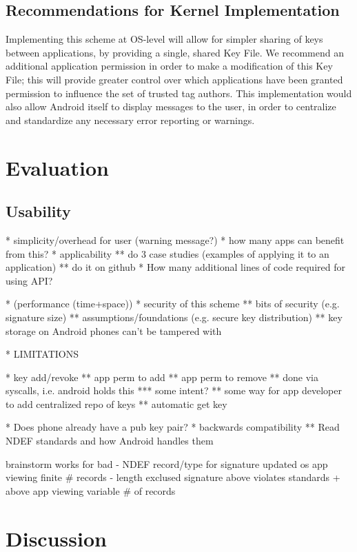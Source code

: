 \documentclass[12pt]{article}
\begin{document}
\subsection{Recommendations for Kernel Implementation}
Implementing this scheme at OS-level will allow for simpler sharing of keys between applications, by providing a single, shared Key File.
We recommend an additional application permission in order to make a modification of this Key File; this will provide greater control over which applications have been granted permission to influence the set of trusted tag authors.
This implementation would also allow Android itself to display messages to the user, in order to centralize and standardize any necessary error reporting or warnings.



\section{Evaluation}
\subsection{Usability}
* simplicity/overhead for user (warning message?)
* how many apps can benefit from this?
* applicability
** do 3 case studies (examples of applying it to an application)
** do it on github
* How many additional lines of code required for using API?

* (performance (time+space))
* security of this scheme
** bits of security (e.g. signature size)
** assumptions/foundations (e.g. secure key distribution)
** key storage on Android phones can't be tampered with

* LIMITATIONS

* key add/revoke
** app perm to add
** app perm to remove
** done via syscalls, i.e. android holds this
*** some intent?
** some way for app developer to add centralized repo of keys
** automatic get key

* Does phone already have a pub key pair?
* backwards compatibility
** Read NDEF standards and how Android handles them

brainstorm                         works for                           bad
- NDEF record/type for signature   updated os
                                   app viewing finite \# records
- length exclused signature        above                               violates standards
  + above                          app viewing variable \# of records   

\section{Discussion}
\end{document}
